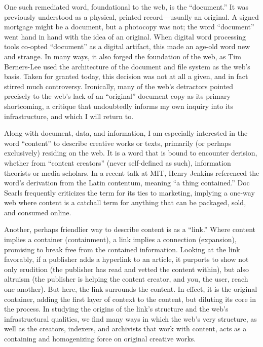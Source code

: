 One such remediated word, foundational to the web, is the “document.” It was previously understood as a physical, printed record—usually an original. A signed mortgage might be a document, but a photocopy was not; the word “document” went hand in hand with the idea of an original. When digital word processing tools co-opted “document” as a digital artifact, this made an age-old word new and strange. In many ways, it also forged the foundation of the web, as Tim Berners-Lee used the architecture of the document and file system as the web’s basis.  Taken for granted today, this decision was not at all a given, and in fact stirred much controversy. Ironically, many of the web’s detractors pointed precisely to the web’s lack of an “original” document copy as its primary shortcoming, a critique that undoubtedly informs my own inquiry into its infrastructure, and which I will return to. 

Along with document, data, and information, I am especially interested in the word “content” to describe creative works or texts, primarily (or perhaps exclusively) residing on the web. It is a word that is bound to encounter derision, whether from “content creators” (never self-defined as such), information theorists or media scholars. In a recent talk at MIT, Henry Jenkins referenced the word’s derivation from the Latin contentum, meaning “a thing contained.”  Doc Searls frequently criticizes the term for its ties to marketing, implying a one-way web where content is a catchall term for anything that can be packaged, sold, and consumed online. 

Another, perhaps friendlier way to describe content is as a “link.” Where content implies a container (containment), a link implies a connection (expansion), promising to break free from the contained information. Looking at the link favorably, if a publisher adds a hyperlink to an article, it purports to show not only erudition (the publisher has read and vetted the content within), but also altruism (the publisher is helping the content creator, and you, the user, reach one another). But here, the link surrounds the content. In effect, it is the original container, adding the first layer of context to the content, but diluting its core in the process. In studying the origins of the link’s structure and the web’s infrastructural qualities, we find many ways in which the web’s very structure, as well as the creators, indexers, and archivists that work with content, acts as a containing and homogenizing force on original creative works.

